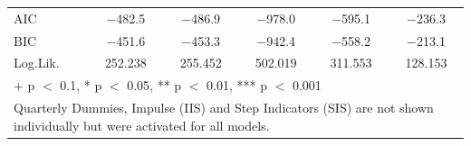 \begin{table}
{\begin{tabular}[t]{lccccc}
AIC & \num{-482.5} & \num{-486.9} & \num{-978.0} & \num{-595.1} & \num{-236.3}\\
BIC & \num{-451.6} & \num{-453.3} & \num{-942.4} & \num{-558.2} & \num{-213.1}\\
Log.Lik. & \num{252.238} & \num{255.452} & \num{502.019} & \num{311.553} & \num{128.153}\\
\bottomrule
\multicolumn{6}{l}{\rule{0pt}{1em}+ p $<$ 0.1, * p $<$ 0.05, ** p $<$ 0.01, *** p $<$ 0.001}\\
\multicolumn{6}{l}{\rule{0pt}{1em}Quarterly Dummies, Impulse (IIS) and Step Indicators (SIS) are not shown individually but were activated for all models.}\\
\end{tabular}}
\end{table}


